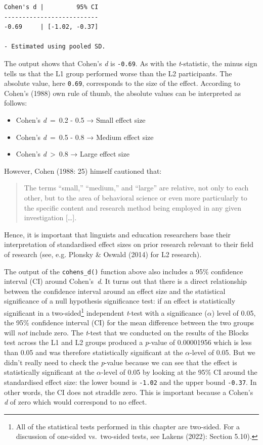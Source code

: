 \documentclass[
  letterpaper,
  DIV=11,
  numbers=noendperiod]{scrreprt}
\providecommand{\tightlist}{%
  \setlength{\itemsep}{0pt}\setlength{\parskip}{0pt}}
\begin{document}
\begin{verbatim}
Cohen's d |         95% CI
--------------------------
-0.69     | [-1.02, -0.37]

- Estimated using pooled SD.
\end{verbatim}

The output shows that Cohen's \emph{d} is \texttt{-0.69}. As with the
\emph{t}-statistic, the minus sign tells us that the L1 group performed
worse than the L2 participants. The absolute value, here \texttt{0.69},
corresponds to the size of the effect. According to Cohen's (1988) own
rule of thumb, the absolute values can be interpreted as follows:

\begin{itemize}
\tightlist
\item
  Cohen's \emph{d}~=~0.2 - 0.5 → Small effect size
\item
  Cohen's \emph{d}~=~0.5 - 0.8 → Medium effect size
\item
  Cohen's \emph{d}~\textgreater~0.8 → Large effect size
\end{itemize}

However, Cohen (1988: 25) himself cautioned that:

\begin{quote}
The terms ``small,'' ``medium,'' and ``large'' are relative, not only to
each other, but to the area of behavioral science or even more
particularly to the specific content and research method being employed
in any given investigation {[}\ldots{]}.
\end{quote}

Hence, it is important that linguists and education researchers base
their interpretation of standardised effect sizes on prior research
relevant to their field of research (see, e.g. Plonsky \& Oswald (2014)
for L2 research).

The output of the \texttt{cohens\_d()} function above also includes a
95\% confidence interval (CI) around Cohen's~\emph{d}. It turns out that
there is a direct relationship between the confidence interval around an
effect size and the statistical significance of a null hypothesis
significance test: if an effect is statistically significant in a
two-sided\footnote{All of the statistical tests performed in this
  chapter are two-sided. For a discussion of one-sided vs.~two-sided
  tests, see Lakens (2022): Section 5.10).} independent \emph{t}-test
with a significance (\(\alpha\)) level of 0.05, the 95\% confidence
interval (CI) for the mean difference between the two groups will
\emph{not} include zero. The \emph{t}-test that we conducted on the
results of the Blocks test across the L1 and L2 groups produced a
\emph{p}-value of 0.00001956 which is less than 0.05 and was therefore
statistically significant at the \(\alpha\)-level of 0.05. But we didn't
really need to check the \emph{p}-value because we can see that the
effect is statistically significant at the \(\alpha\)-level of 0.05 by
looking at the 95\% CI around the standardised effect size: the lower
bound is \texttt{-1.02} and the upper bound \texttt{-0.37}. In other
words, the CI does not straddle zero. This is important because a
Cohen's \emph{d} of zero which would correspond to no effect.
\end{document}
